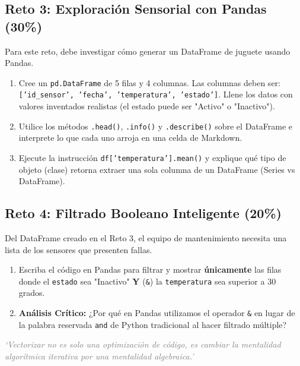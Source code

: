 \documentclass[12pt,a4paper]{article}
\begin{document}
\subsection*{Reto 3: Exploración Sensorial con Pandas (30\%)}
Para este reto, debe investigar cómo generar un DataFrame de juguete usando Pandas.
\begin{enumerate}
    \item Cree un \texttt{pd.DataFrame} de 5 filas y 4 columnas. Las columnas deben ser: \texttt{['id\_sensor', 'fecha', 'temperatura', 'estado']}. Llene los datos con valores inventados realistas (el estado puede ser "Activo" o "Inactivo").
    \item Utilice los métodos \texttt{.head()}, \texttt{.info()} y \texttt{.describe()} sobre el DataFrame e interprete lo que cada uno arroja en una celda de Markdown.
    \item Ejecute la instrucción \texttt{df['temperatura'].mean()} y explique qué tipo de objeto (clase) retorna extraer una sola columna de un DataFrame (Series vs DataFrame).
\end{enumerate}

\subsection*{Reto 4: Filtrado Booleano Inteligente (20\%)}
Del DataFrame creado en el Reto 3, el equipo de mantenimiento necesita una lista de los sensores que presenten fallas.
\begin{enumerate}
    \item Escriba el código en Pandas para filtrar y mostrar \textbf{únicamente} las filas donde el \texttt{estado} sea "Inactivo" \textbf{Y} (\texttt{\&}) la \texttt{temperatura} sea superior a 30 grados.
    \item \textbf{Análisis Crítico:} ¿Por qué en Pandas utilizamos el operador \texttt{\&} en lugar de la palabra reservada \texttt{and} de Python tradicional al hacer filtrado múltiple?
\end{enumerate}

\vspace{1cm}
\begin{center}
    \textit{\textcolor{gray}{`Vectorizar no es solo una optimización de código, es cambiar la mentalidad algorítmica iterativa por una mentalidad algebraica.'}}
\end{center}
\end{document}
